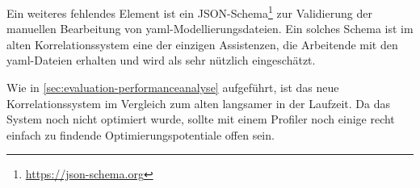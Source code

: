 Ein weiteres fehlendes Element ist ein JSON-Schema\footnote{\url{https://json-schema.org}} zur Validierung der manuellen Bearbeitung von \acrshort{yaml}-Modellierungsdateien.
Ein solches Schema ist im alten Korrelationssystem eine der einzigen Assistenzen, die Arbeitende mit den \acrshort{yaml}-Dateien erhalten und wird als sehr nützlich eingeschätzt.

Wie in \autoref{sec:evaluation-performanceanalyse} aufgeführt, ist das neue Korrelationssystem im Vergleich zum alten langsamer in der Laufzeit.
Da das System noch nicht optimiert wurde, sollte mit einem Profiler noch einige recht einfach zu findende Optimierungspotentiale offen sein.

